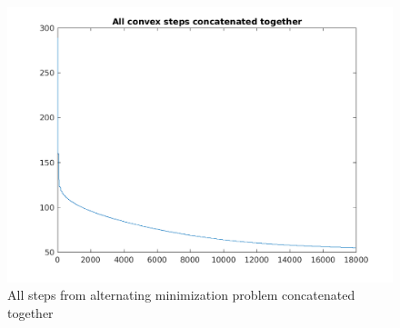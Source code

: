 \documentclass{article}
\newcommand{\0}{\mathrm{0}}
\newcommand{\1}{\mathrm{1}}
\begin{document}
\begin{figure}
  \includegraphics[width=\textwidth]{fixed-step-all.png}
  \caption{All steps from alternating minimization problem concatenated together}
\end{figure}
\end{document}
